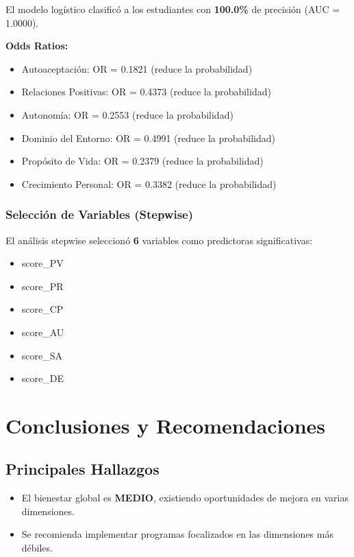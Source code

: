 \documentclass[12pt,a4paper]{article}
\begin{document}
El modelo logístico clasificó a los estudiantes con \textbf{100.0\%} 
de precisión (AUC = 1.0000).

\textbf{Odds Ratios:}

\begin{itemize}
    \item Autoaceptación: OR = 0.1821 (reduce la probabilidad)
    \item Relaciones Positivas: OR = 0.4373 (reduce la probabilidad)
    \item Autonomía: OR = 0.2553 (reduce la probabilidad)
    \item Dominio del Entorno: OR = 0.4991 (reduce la probabilidad)
    \item Propósito de Vida: OR = 0.2379 (reduce la probabilidad)
    \item Crecimiento Personal: OR = 0.3382 (reduce la probabilidad)

\end{itemize}


\subsubsection{Selección de Variables (Stepwise)}

El análisis stepwise seleccionó \textbf{6} 
variables como predictoras significativas:

\begin{itemize}
    \item score_PV
    \item score_PR
    \item score_CP
    \item score_AU
    \item score_SA
    \item score_DE

\end{itemize}


\section{Conclusiones y Recomendaciones}

\subsection{Principales Hallazgos}

\begin{itemize}
    \item El bienestar global es \textcolor{siyellow}{\textbf{MEDIO}}, existiendo 
    oportunidades de mejora en varias dimensiones.
    \item Se recomienda implementar programas focalizados en las dimensiones más débiles.
\end{itemize}
\end{document}
